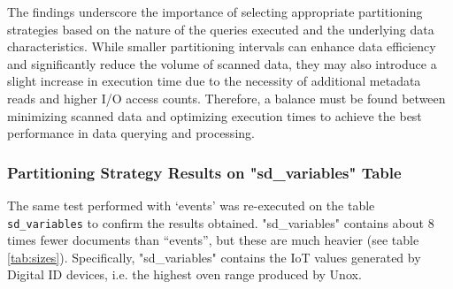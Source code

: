 The findings underscore the importance of selecting appropriate partitioning strategies based on the nature of the queries executed and the underlying data characteristics. While smaller partitioning intervals can enhance data efficiency and significantly reduce the volume of scanned data, they may also introduce a slight increase in execution time due to the necessity of additional metadata reads and higher \ac{I/O} access counts. Therefore, a balance must be found between minimizing scanned data and optimizing execution times to achieve the best performance in data querying and processing.

\subsubsection{Partitioning Strategy Results on "sd\_variables" Table}
The same test performed with ‘events’ was re-executed on the table \\\texttt{sd\_variables} to confirm the results obtained.
"sd\_variables" contains about 8 times fewer documents than “events”, but these are much heavier (see table \ref{tab:sizes}). Specifically, "sd\_variables" contains the \ac{IoT} values generated by Digital ID devices, i.e. the highest oven range produced by Unox.

